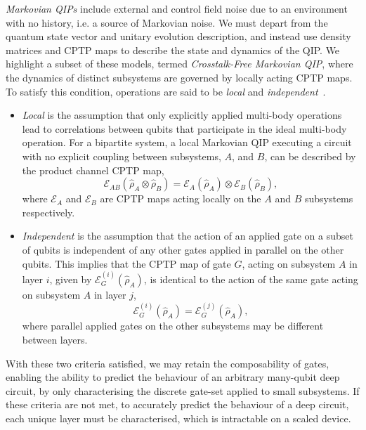 \emph{Markovian QIPs} include external and control field noise due to an environment with no history, i.e. a source of Markovian noise. We must depart from the quantum state vector and unitary evolution description, and instead use density matrices and CPTP maps to describe the state and dynamics of the QIP.
We highlight a subset of these models, termed \emph{Crosstalk-Free Markovian QIP}, where the dynamics of distinct subsystems are governed by locally acting CPTP maps. To satisfy this condition, operations are said to be \emph{local} and \emph{independent}~\cite{sarovar_detecting_2020}.
\begin{itemize}
\item\emph{Local} is the assumption that only explicitly applied multi-body operations lead to correlations between qubits that participate in the ideal multi-body operation. For a bipartite system, a local Markovian QIP executing a circuit with no explicit coupling between subsystems, $A$, and $B$, can be described by the product channel CPTP map,
\begin{equation}
    \label{eqn:k-copy_local}
    \mathcal{E}_{AB}(\hat\rho_A\otimes\hat\rho_B) = \mathcal{E}_A(\hat\rho_A)\otimes\mathcal{E}_B(\hat\rho_B),
\end{equation}
where $\mathcal{E}_A$ and $\mathcal{E}_B$ are CPTP maps acting locally on the $A$ and $B$ subsystems respectively.\\
\item\emph{Independent} is the assumption that the action of an applied gate on a
subset of qubits is independent of any other gates applied in parallel on the
other qubits. This implies that the CPTP map of gate $G$, acting on subsystem $A$ in layer $i$, given by $\mathcal{E}_G^{(i)}(\hat\rho_A)$, is identical to the action of the same gate acting on subsystem $A$ in layer $j$, 
\begin{equation}
    \label{eqn:k-copy_independent}
    \mathcal{E}_G^{(i)}(\hat\rho_A)=\mathcal{E}_G^{(j)}(\hat\rho_A),
\end{equation}
where parallel applied gates on the other subsystems may be different between layers.
\end{itemize}
With these two criteria satisfied, we may retain the composability
of gates, enabling the ability to predict the behaviour of an arbitrary
many-qubit deep circuit, by only characterising the discrete gate-set applied to small subsystems. If these criteria are not met,
to accurately predict the behaviour of a deep circuit, each unique layer must be
characterised, which is intractable on a scaled device. 


